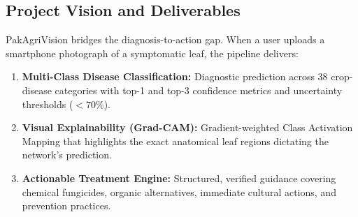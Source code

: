 \subsection{Project Vision and Deliverables}
PakAgriVision bridges the diagnosis-to-action gap. When a user uploads a smartphone photograph of a symptomatic leaf, the pipeline delivers:
\begin{enumerate}
    \item \textbf{Multi-Class Disease Classification:} Diagnostic prediction across 38 crop-disease categories with top-1 and top-3 confidence metrics and uncertainty thresholds ($<70\%$).
    \item \textbf{Visual Explainability (Grad-CAM):} Gradient-weighted Class Activation Mapping that highlights the exact anatomical leaf regions dictating the network's prediction.
    \item \textbf{Actionable Treatment Engine:} Structured, verified guidance covering chemical fungicides, organic alternatives, immediate cultural actions, and prevention practices.
\end{enumerate}
